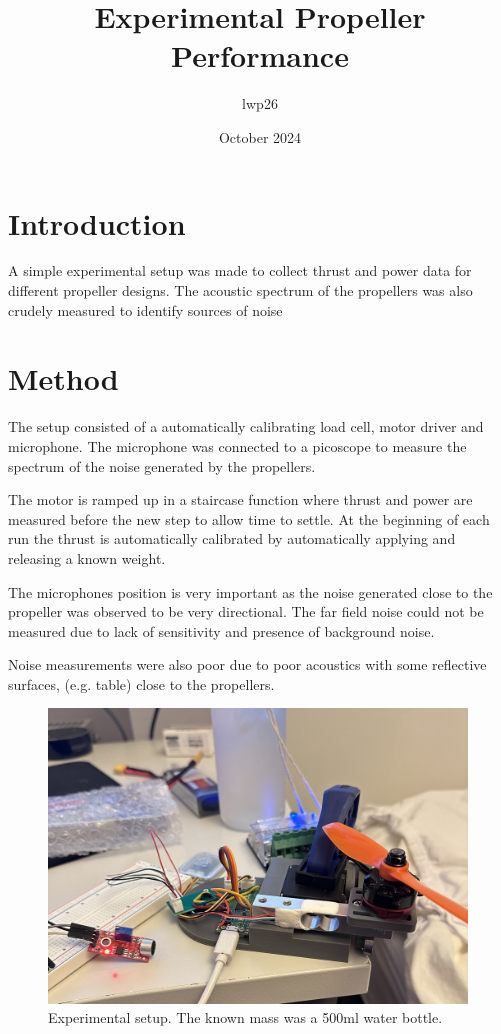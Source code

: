\documentclass[8pt]{article}
\begin{document}


\title{Experimental Propeller Performance}
\author{lwp26}
\date{October 2024}
\maketitle

\section{Introduction}

A simple experimental setup was made to collect thrust and power data for different propeller designs.
The acoustic spectrum of the propellers was also crudely measured to identify sources of noise 


\section{Method}

The setup consisted of a automatically calibrating load cell, motor driver and microphone.
The microphone was connected to a picoscope to measure the spectrum of the noise generated by the propellers.

The motor is ramped up in a staircase function where thrust and power are measured before the new step to allow time to settle.
At the beginning of each run the thrust is automatically calibrated by automatically applying and releasing a known weight.

The microphones position is very important as the noise generated close to the propeller was observed to be very directional.
The far field noise could not be measured due to lack of sensitivity and presence of background noise.

Noise measurements were also poor due to poor acoustics with some reflective surfaces, (e.g. table) close to the propellers.


\begin{figure}
    \centering
    \includegraphics[width=0.99\textwidth]{setup.jpg}
    \caption{Experimental setup. The known mass was a 500ml water bottle.}
    \label{fig:setup}
\end{figure}
\end{document}
